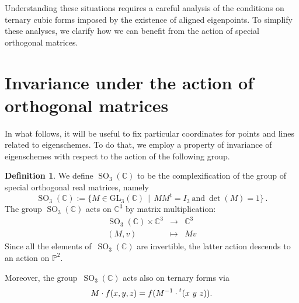 \documentclass[a4paper, 11pt, reqno]{amsart}
\theoremstyle{plain}
\theoremstyle{definition}
\newtheorem{definition}[lemma]{Definition}
\newcommand{\C}{\mathbb{C}}
\newcommand{\p}{\mathbb{P}}
\newcommand{\SO}{\operatorname{SO}}
\begin{document}
Understanding these situations requires a careful analysis of the conditions on ternary cubic forms imposed by the existence of aligned eigenpoints.
To simplify these analyses, we clarify how we can benefit from the action of special orthogonal matrices.

\section{Invariance under the action of orthogonal matrices}
\label{invariance}

In what follows, it will be useful to fix particular coordinates for points and lines related to eigenschemes.
To do that, we employ a property of invariance of eigenschemes with respect to the action of the following group.

\begin{definition}
We define $\SO_3(\C)$ to be the complexification of the group of special orthogonal real matrices, namely
%
\[
  \SO_3(\C) :=
  \bigl\{
    M \in \mathrm{GL}_3(\C) \, \mid \,
    M M^t = I_3 \ \text{and} \ \det(M) = 1
  \bigr\} \,.
\]
%
The group $\SO_3(\C)$ acts on $\C^3$ by matrix multiplication:
%
\[
  \begin{array}{ccc}
    \SO_3(\C) \times \C^3 & \rightarrow & \C^3 \\
    (M, v) & \mapsto & Mv
  \end{array}
\]
%
Since all the elements of~$\SO_3(\C)$ are invertible, the latter action descends to an action on $\p^2$.

Moreover, the group~$\SO_3(\C)$ acts also on ternary forms via
%
\[
  M \cdot f (x,y,z) = f(M^{-1} \cdot \prescript{t} {}( x \ y \ z ) ).
\]
%
\end{definition}
\end{document}
